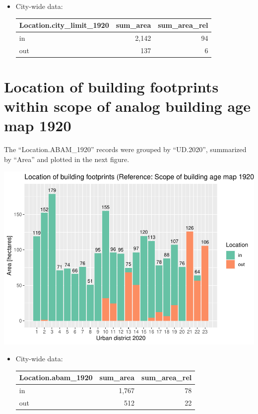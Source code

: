 \documentclass[
]{article}
\providecommand{\tightlist}{%
  \setlength{\itemsep}{0pt}\setlength{\parskip}{0pt}}
\begin{document}
\begin{itemize}
\tightlist
\item
  City-wide data:

  \begin{tabular}[t]{l|r|r}
  \hline
  Location.city\_limit\_1920 & sum\_area & sum\_area\_rel\\
  \hline
  in & 2,142 & 94\\
  \hline
  out & 137 & 6\\
  \hline
  \end{tabular}
\end{itemize}

\hypertarget{location-of-building-footprints-within-scope-of-analog-building-age-map-1920}{%
\section{Location of building footprints within scope of analog building
age map
1920}\label{location-of-building-footprints-within-scope-of-analog-building-age-map-1920}}

The ``Location.ABAM\_1920'' records were grouped by ``UD.2020'',
summarized by ``Area'' and plotted in the next figure.

\includegraphics{Usage_code_files/figure-latex/unnamed-chunk-11-1.pdf}

\begin{itemize}
\tightlist
\item
  City-wide data:

  \begin{tabular}[t]{l|r|r}
  \hline
  Location.abam\_1920 & sum\_area & sum\_area\_rel\\
  \hline
  in & 1,767 & 78\\
  \hline
  out & 512 & 22\\
  \hline
  \end{tabular}
\end{itemize}
\end{document}
